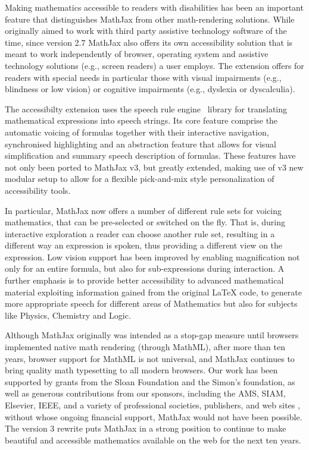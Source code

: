 \documentclass[11pt]{article} %
\begin{document}
Making mathematics accessible to readers with disabilities has been an
important feature that distinguishes MathJax from other math-rendering
solutions. While originally aimed to work with third party assistive
technology software of the time, since version 2.7 MathJax also offers
its own accessibility solution that is meant to work independently of
browser, operating system and assistive technology solutions (e.g.,
screen readers) a user employs. The extension offers for readers with
special needs in particular those with visual impairments (e.g.,
blindness or low vision) or cognitive impairments (e.g., dyslexia or
dyscalculia).

The accessibilty extension uses the speech rule engine~\cite{SRE}
library for translating mathematical expressions into speech strings.
Its core feature comprise the automatic voicing of formulas together
with their interactive navigation, synchronised highlighting and an
abstraction feature that allows for visual simplification and summary
speech description of formulas.  These features have not only been
ported to MathJax v3, but greatly extended, making use of v3 new
modular setup to allow for a flexible pick-and-mix style
personalization of accessibility tools.

In particular, MathJax now offers a number of different rule sets for
voicing mathematics, that can be pre-selected or switched on the
fly. That is, during interactive exploration a reader can choose
another rule set, resulting in a different way an expression is
spoken, thus providing a different view on the expression.  Low vision
support has been improved by enabling magnification not only for an
entire formula, but also for sub-expressions during interaction. A
further emphasis is to provide better accessibility to advanced
mathematical material exploiting information gained from the original
LaTeX code, to generate more appropriate speech for different areas of
Mathematics but also for subjects like Physics, Chemistry and Logic.

Although MathJax originally was intended as a stop-gap measure until
browsers implemented native math rendering (through MathML), after
more than ten years, browser support for MathML is not universal, and
MathJax continues to bring quality math typesetting to all modern
browsers.  Our work has been supported by grants from the Sloan
Foundation and the Simon's foundation, as well as generous
contributions from our sponsors, including the AMS, SIAM, Elsevier,
IEEE, and a variety of professional societies, publishers, and web
sites \cite{MJ-sponsors}, without whose ongoing financial support,
MathJax would not have been possible.  The version 3 rewrite puts
MathJax in a strong position to continue to make beautiful and
accessible mathematics available on the web for the next ten years.
\end{document}

